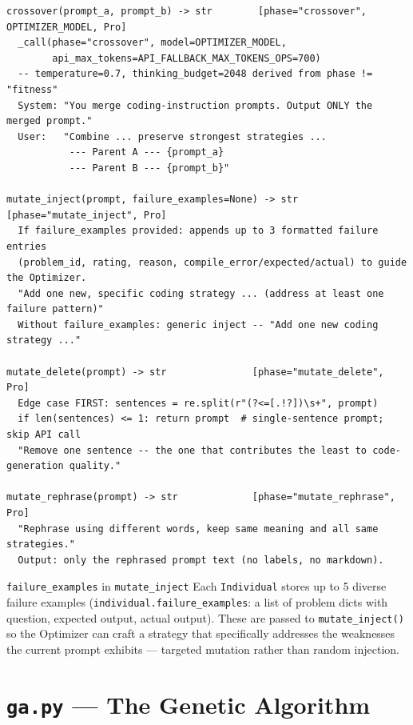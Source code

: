 \documentclass[11pt,a4paper]{report}
\newcommand{\fn}[1]{\texttt{#1}}
\newcommand{\pyf}[1]{\texttt{#1}}
\begin{document}
\begin{lstlisting}[style=chain]
crossover(prompt_a, prompt_b) -> str        [phase="crossover", OPTIMIZER_MODEL, Pro]
  _call(phase="crossover", model=OPTIMIZER_MODEL,
        api_max_tokens=API_FALLBACK_MAX_TOKENS_OPS=700)
  -- temperature=0.7, thinking_budget=2048 derived from phase != "fitness"
  System: "You merge coding-instruction prompts. Output ONLY the merged prompt."
  User:   "Combine ... preserve strongest strategies ...
           --- Parent A --- {prompt_a}
           --- Parent B --- {prompt_b}"

mutate_inject(prompt, failure_examples=None) -> str  [phase="mutate_inject", Pro]
  If failure_examples provided: appends up to 3 formatted failure entries
  (problem_id, rating, reason, compile_error/expected/actual) to guide the Optimizer.
  "Add one new, specific coding strategy ... (address at least one failure pattern)"
  Without failure_examples: generic inject -- "Add one new coding strategy ..."

mutate_delete(prompt) -> str               [phase="mutate_delete", Pro]
  Edge case FIRST: sentences = re.split(r"(?<=[.!?])\s+", prompt)
  if len(sentences) <= 1: return prompt  # single-sentence prompt; skip API call
  "Remove one sentence -- the one that contributes the least to code-generation quality."

mutate_rephrase(prompt) -> str             [phase="mutate_rephrase", Pro]
  "Rephrase using different words, keep same meaning and all same strategies."
  Output: only the rephrased prompt text (no labels, no markdown).
\end{lstlisting}

\begin{concept}{\fn{failure\_examples} in \fn{mutate\_inject}}
Each \fn{Individual} stores up to 5 diverse failure examples
(\fn{individual.failure\_examples}: a list of problem dicts with question, expected
output, actual output).  These are passed to \fn{mutate\_inject()} so the Optimizer
can craft a strategy that specifically addresses the weaknesses the current prompt
exhibits --- targeted mutation rather than random injection.
\end{concept}


\chapter{\pyf{ga.py} --- The Genetic Algorithm}
\end{document}
